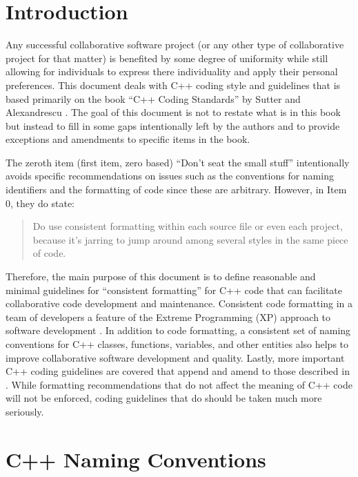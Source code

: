 %
\section{Introduction}
%

Any successful collaborative software project (or any other type of
collaborative project for that matter) is benefited by some degree of
uniformity while still allowing for individuals to express there individuality
and apply their personal preferences.  This document deals with C++ coding
style and guidelines that is based primarily on the book ``C++ Coding
Standards'' by Sutter and Alexandrescu {}\cite{C++CodingStandards05}.  The
goal of this document is not to restate what is in this book but instead to
fill in some gaps intentionally left by the authors and to provide exceptions
and amendments to specific items in the book.

The zeroth item (first item, zero based) ``Don't seat the small stuff''
intentionally avoids specific recommendations on issues such as the conventions
for naming identifiers and the formatting of code since these are arbitrary.
However, in Item 0, they do state:

\begin{quote}

Do use consistent formatting within each source file or even each project,
because it's jarring to jump around among several styles in the same piece of
code.

\end{quote}

Therefore, the main purpose of this document is to define reasonable and
minimal guidelines for ``consistent formatting'' for C++ code that can
facilitate collaborative code development and maintenance.  Consistent code
formatting in a team of developers a feature of the Extreme Programming (XP)
approach to software development {}\cite{ExtremeProgramming}.  In addition to
code formatting, a consistent set of naming conventions for C++ classes,
functions, variables, and other entities also helps to improve collaborative
software development and quality.  Lastly, more important C++ coding
guidelines are covered that append and amend to those described in
{}\cite{C++CodingStandards05}.  While formatting recommendations that do not
affect the meaning of C++ code will not be enforced, coding guidelines that do
should be taken much more seriously.

%
\section{C++ Naming Conventions}
%

